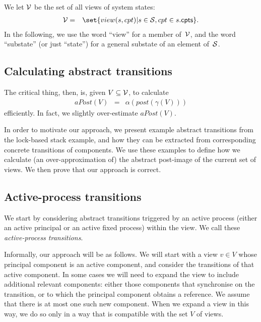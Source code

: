 We let $\V$ be the set of all views of system states:
%
\begin{eqnarray*}
\V & = & 
  \set{view(s, cpt) | s \in \S, cpt \in s.\cpt}. %
\end{eqnarray*}
%
In the following, we use the word ``view'' for a member of~$\V$, and the word
``substate'' (or just ``state'') for a general substate of an element of~$\S$.


\subsection{Calculating abstract transitions}

The critical thing, then, is, given $V \subseteq \V$, to calculate
\begin{eqnarray*}
aPost(V) & = & \alpha(post(\gamma(V)))
\end{eqnarray*}
efficiently.  In fact, we slightly over-estimate $aPost(V)$.


In order to motivate our approach, we present example abstract transitions
from the lock-based stack example, and how they can be extracted from
corresponding concrete transitions of components.  We use these examples to
define how we calculate (an over-approximation of) the abstract post-image of
the current set of views.  We then prove that our approach is correct.



\subsection{Active-process transitions}

We start by considering abstract transitions triggered by an active process
(either an active principal or an active fixed process) within the view.  We
call these \emph{active-process transitions}.

Informally, our approach will be as follows.  We will start with a view $v \in
V$ whose principal component is an active component, and consider the
transitions of that active component.  In some cases we will need to expand
the view to include additional relevant components: either those components
that synchronise on the transition, or to which the principal component
obtains a reference.  We assume that there is at most one such new component.
When we expand a view in this way, we do so only in a way that is compatible
with the set $V$ of views.

